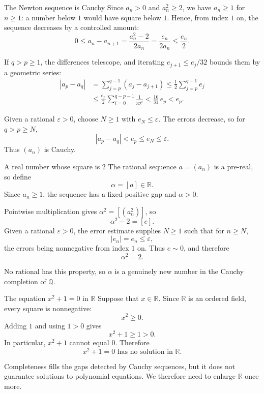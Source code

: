 \documentclass[aspectratio=169,11pt]{beamer}
\newcommand{\Q}{\mathbb Q}
\newcommand{\R}{\mathbb R}
\begin{document}
\begin{frame}{The Newton sequence is Cauchy}
  \footnotesize
  Since \(a_n>0\) and \(a_n^2\ge2\), we have \(a_n\ge1\) for \(n\ge1\):
  a number below \(1\) would have square below \(1\).  Hence, from index
  \(1\) on, the sequence decreases by a controlled amount:
  \[
    0\le a_n-a_{n+1}
      =\frac{a_n^2-2}{2a_n}
      =\frac{e_n}{2a_n}
      \le\frac{e_n}{2}.
  \]

  If \(q>p\ge1\), the differences telescope, and iterating
  \(e_{j+1}\le e_j/32\) bounds them by a geometric series:
  \begin{align*}
    |a_p-a_q|
      &=\sum_{j=p}^{q-1}(a_j-a_{j+1})
       \le\frac12\sum_{j=p}^{q-1}e_j\\
      &\le\frac{e_p}{2}\sum_{i=0}^{q-p-1}\frac1{32^i}
       <\frac{16}{31}\,e_p<e_p.
  \end{align*}

  Given a rational \(\varepsilon>0\), choose \(N\ge1\) with
  \(e_N\le\varepsilon\).  The errors decrease, so for \(q>p\ge N\),
  \[
    |a_p-a_q|<e_p\le e_N\le\varepsilon.
  \]
  Thus \((a_n)\) is Cauchy.
\end{frame}

\begin{frame}{A real number whose square is \(2\)}
  \small
  The rational sequence \(a=(a_n)\) is a pre-real, so define
  \[
    \alpha=[a]\in\R.
  \]
  Since \(a_n\ge1\), the sequence has a fixed positive gap and \(\alpha>0\).

  Pointwise multiplication gives \(\alpha^2=[(a_n^2)]\), so
  \[
    \alpha^2-2=[e].
  \]
  Given a rational \(\varepsilon>0\), the error estimate supplies
  \(N\ge1\) such that for \(n\ge N\),
  \[
    |e_n|=e_n\le\varepsilon,
  \]
  the errors being nonnegative from index \(1\) on.  Thus \(e\sim0\), and
  therefore
  \[
    \boxed{\alpha^2=2.}
  \]

  No rational has this property, so \(\alpha\) is a genuinely new number in
  the Cauchy completion of \(\Q\).
\end{frame}

\begin{frame}{The equation \(x^2+1=0\) in \(\R\)}
  Suppose that \(x\in\R\).  Since \(\R\) is an ordered field, every square
  is nonnegative:
  \[
    x^2\ge0.
  \]
  Adding \(1\) and using \(1>0\) gives
  \[
    x^2+1\ge1>0.
  \]
  In particular, \(x^2+1\) cannot equal \(0\).  Therefore
  \[
    \boxed{x^2+1=0\text{ has no solution in }\R.}
  \]

  Completeness fills the gaps detected by Cauchy sequences, but it does not
  guarantee solutions to polynomial equations.  We therefore need to enlarge
  \(\R\) once more.
\end{frame}
\end{document}
